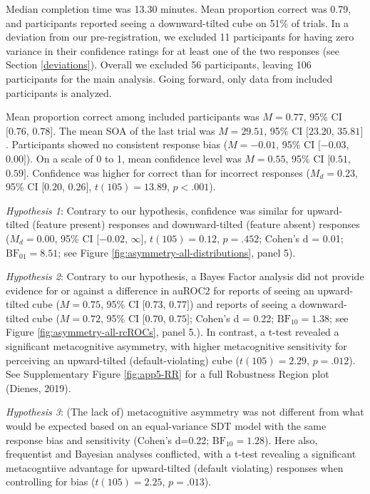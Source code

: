 \documentclass[12pt,twoside]{reedthesis}
\begin{document}
Median completion time was 13.30 minutes. Mean proportion correct was 0.79, and participants reported seeing a downward-tilted cube on 51\% of trials. In a deviation from our pre-registration, we excluded 11 participants for having zero variance in their confidence ratings for at least one of the two responses (see Section \ref{deviations}). Overall we excluded 56 participants, leaving 106 participants for the main analysis. Going forward, only data from included participants is analyzed.

Mean proportion correct among included participants was \(M = 0.77\), 95\% CI \([0.76\), \(0.78]\). The mean SOA of the last trial was \(M = 29.51\), 95\% CI \([23.20\), \(35.81]\). Participants showed no consistent response bias (\(M = -0.01\), 95\% CI \([-0.03\), \(0.00]\)). On a scale of 0 to 1, mean confidence level was \(M = 0.55\), 95\% CI \([0.51\), \(0.59]\). Confidence was higher for correct than for incorrect responses (\(M_d = 0.23\), 95\% CI \([0.20\), \(0.26]\), \(t(105) = 13.89\), \(p < .001\)).

\emph{Hypothesis 1}: Contrary to our hypothesis, confidence was similar for upward-tilted (feature present) responses and downward-tilted (feature absent) responses (\(M_d = 0.00\), 95\% CI \([-0.02\), \(\infty]\), \(t(105) = 0.12\), \(p = .452\); Cohen's d = 0.01; \(\mathrm{BF}_{\textrm{01}} = 8.51\); see Figure \ref{fig:asymmetry-all-distributions}, panel 5).

\emph{Hypothesis 2}: Contrary to our hypothesis, a Bayes Factor analysis did not provide evidence for or against a difference in auROC2 for reports of seeing an upward-tilted cube (\(M = 0.75\), 95\% CI \([0.73\), \(0.77]\)) and reports of seeing a downward-tilted cube (\(M = 0.72\), 95\% CI \([0.70\), \(0.75]\); Cohen's d = 0.22; \(\mathrm{BF}_{\textrm{10}} = 1.38\); see Figure \ref{fig:asymmetry-all-rcROCs}, panel 5.). In contrast, a t-test revealed a significant metacognitive asymmetry, with higher metacognitive sensitivity for perceiving an upward-tilted (default-violating) cube (\(t(105) = 2.29\), \(p = .012\)). See Supplementary Figure \ref{fig:app5-RR} for a full Robustness Region plot (Dienes, 2019).

\emph{Hypothesis 3}: (The lack of) metacognitive asymmetry was not different from what would be expected based on an equal-variance SDT model with the same response bias and sensitivity (Cohen's d=0.22; \(\mathrm{BF}_{\textrm{10}} = 1.28\)). Here also, frequentist and Bayesian analyses conflicted, with a t-test revealing a significant metacogntiive advantage for upward-tilted (default violating) responses when controlling for bias (\(t(105) = 2.25\), \(p = .013\)).
\end{document}

